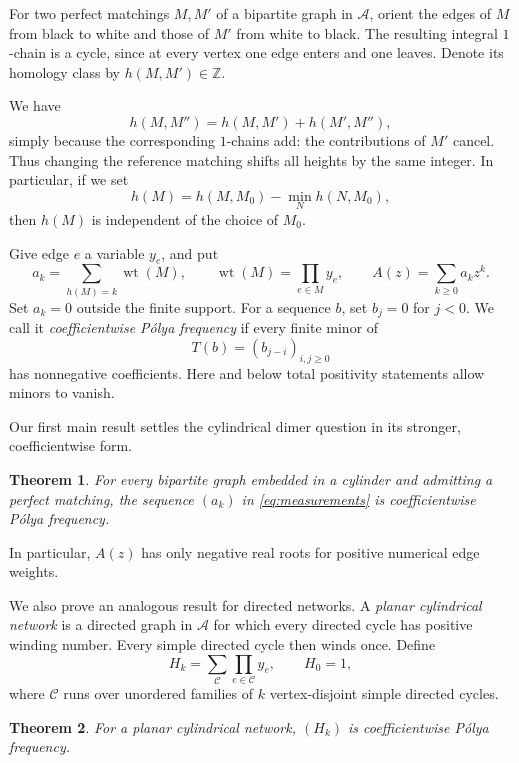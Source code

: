 \documentclass[11pt]{article}
\newtheorem{theorem}{Theorem}[section]
\theoremstyle{definition}
\theoremstyle{remark}
\newcommand{\wt}{\operatorname{wt}}
\newcommand{\cyl}{\mathcal A}
\begin{document}
For two perfect matchings $M,M'$ of a bipartite graph
in $\cyl$, orient the edges of $M$ from black to white
and those of $M'$ from white to black. The resulting
integral $1$-chain is a cycle, since at every vertex
one edge enters and one leaves. Denote its homology
class by $h(M,M')\in\mathbb Z$.

We have
\[
h(M,M'')=h(M,M')+h(M',M''),
\]
simply because the corresponding $1$-chains add:
the contributions of $M'$ cancel. Thus changing the
reference matching shifts all heights by the same
integer. In particular, if we set
\[
h(M)=h(M,M_0)-\min_N h(N,M_0),
\]
then $h(M)$ is independent of the choice of $M_0$.


Give edge $e$ a variable $y_e$, and put
\begin{equation}\label{eq:measurements}
 a_k=\sum_{h(M)=k}\wt(M),\qquad
 \wt(M)=\prod_{e\in M}y_e,\qquad A(z)=\sum_{k\ge0}a_kz^k.
\end{equation}
Set $a_k=0$ outside the finite support. For a sequence $b$, set $b_j=0$ for $j<0$. We call it \emph{coefficientwise P\'olya frequency} if every finite minor of
\[
 T(b)=(b_{j-i})_{i,j\ge0}
\]
has nonnegative coefficients. Here and below total positivity statements allow minors to vanish.


Our first main result settles the cylindrical dimer question
in its stronger, coefficientwise form.

\begin{theorem}\label{thm:dimer}
For every bipartite graph embedded in a cylinder and
admitting a perfect matching, the sequence $(a_k)$
in \eqref{eq:measurements} is coefficientwise
P\'olya frequency.
\end{theorem}

In particular, $A(z)$ has only negative real roots
for positive numerical edge weights.

We also prove an analogous result for directed networks.
A \emph{planar cylindrical network} is a directed graph
in $\cyl$ for which every directed cycle has positive
winding number. Every simple directed cycle then winds
once. Define
\begin{equation}\label{eq:H}
 H_k=\sum_{\mathcal C}\prod_{e\in\mathcal C}y_e,
 \qquad H_0=1,
\end{equation}
where $\mathcal C$ runs over unordered families of
$k$ vertex-disjoint simple directed cycles.

\begin{theorem}\label{thm:network}
For a planar cylindrical network, $(H_k)$ is
coefficientwise P\'olya frequency.
\end{theorem}
\end{document}
